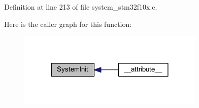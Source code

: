 Definition at line 213 of file system\+\_\+stm32f10x.\+c.

Here is the caller graph for this function\+:
\nopagebreak
\begin{figure}[H]
\begin{center}
\leavevmode
\includegraphics[width=252pt]{group___s_t_m32_f10x___system___exported___functions_ga93f514700ccf00d08dbdcff7f1224eb2_icgraph}
\end{center}
\end{figure}
